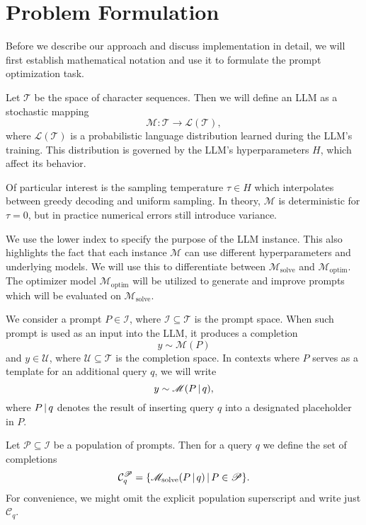 \section{Problem Formulation}\label{sec:notation}
Before we describe our approach and discuss implementation in detail, we will first establish mathematical notation and use it to 
formulate the prompt optimization task.

Let $\mathcal{T}$ be the space of character sequences. Then we will define an LLM as a stochastic mapping
\begin{equation}
    \mathscr{M}: \mathcal{T} \rightarrow \mathcal{L}(\mathcal{T}),
\end{equation}
where $\mathcal{L}(\mathcal{T})$ is a probabilistic language distribution learned during the LLM's training.
This distribution is governed by the LLM's hyperparameters $H$, which affect its behavior. 

Of particular interest is the sampling temperature $\tau \in H$ which interpolates between greedy decoding and uniform sampling.
In theory, $\mathscr{M}$ is deterministic for $\tau=0$, but in practice numerical errors still introduce variance.

We use the lower index to specify the purpose of the LLM instance. This also highlights
the fact that each instance $\mathscr{M}$ can use different hyperparameters and underlying models. 
We will use this to differentiate between $\mathscr{M}_{\text{solve}}$ and $\mathscr{M}_{\text{optim}}$.
The optimizer model $\mathscr{M}_{\text{optim}}$ will be utilized to generate and improve prompts which will be evaluated on $\mathscr{M}_{\text{solve}}$.


We consider a prompt $P \in \mathcal{I}$, where $\mathcal{I} \subseteq \mathcal{T}$ is the prompt space.
When such prompt is used as an input into the LLM, it produces a completion
\begin{equation}
    y \sim \mathscr{M}(P)
\end{equation}
and $y \in \mathcal{U}$, where
$\mathcal{U} \subseteq \mathcal{T}$ is the completion space.
In contexts where $P$ serves as a template for an additional query $q$, we will write
\begin{equation}
    y \sim \mathscr{M}(P\, \vert \, q),
\end{equation}
where $P \, \vert \, q$ denotes the result of inserting query $q$ into a designated placeholder in $P$.

Let $\mathscr{P} \subseteq \mathcal{I}$ be a population of prompts. Then for a query $q$ we define the set of completions 
\begin{equation}
    \mathcal{C}_{q}^{\mathscr{P}} = \{\mathscr{M}_{\text{solve}}(P\, \vert \, q)\, \vert \, P \in \mathscr{P}\}.
\end{equation}
For convenience, we might omit the explicit population superscript and write just $ \mathcal{C}_{q}$.

